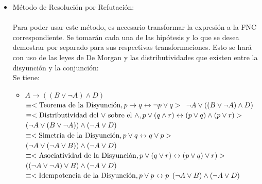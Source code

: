 \documentclass{article}
\begin{document}
\begin{itemize}
\begin{itemize}
	\item M\'etodo de Resoluci\'on por Refutaci\'on:
	
		\paragraph{}
		Para poder usar este m\'etodo, es necesario transformar la expresi\'on a la FNC correspondiente. Se tomar\'an cada una de las hip\'otesis y lo que se desea demostrar por separado para sus respectivas transformaciones. Esto se har\'a con uso de las leyes de De Morgan y las distributividades que existen entre la disyunci\'on y la conjunci\'on: \\
		
		Se tiene:
		
		\begin{itemize}

		\item $ A \rightarrow (( B \lor \neg A ) \land D)$ \\
				$\equiv < \text{Teorema de la Disyunci\'on},  
					p \rightarrow q \leftrightarrow \neg p \lor q > \\$
				$\neg A \lor ((B \lor \neg A) \land D)\\$		
				$\equiv <\text{Distributividad del $\lor$ sobre el $\land$}, 		
					p \lor (q \land r) \leftrightarrow (p \lor q) \land (p \lor r)>\\$
				$ (\neg A \lor (B \lor \neg A)) \land (\neg A \lor D) \\$
				$\equiv < \text{Simetr\'ia de la Disyunci\'on}, 
					p \lor q \leftrightarrow q \lor p >\\$
				$(\neg A \lor (\neg A \lor B)) \land (\neg A \lor D) \\$
				$\equiv <\text{Asociatividad de la Disyunci\'on}, 
					p \lor (q \lor r) \leftrightarrow (p \lor q) \lor r) >\\$
				$((\neg A \lor \neg A) \lor B) \land (\neg A \lor D) \\$
				$\equiv <\text{Idempotencia de la Disyunci\'on}, 
					p \lor p \leftrightarrow p\\$
				$(\neg A \lor B) \land (\neg A \lor D)\\$
								

\end{itemize}
\end{itemize}
\end{itemize}
\end{document}
